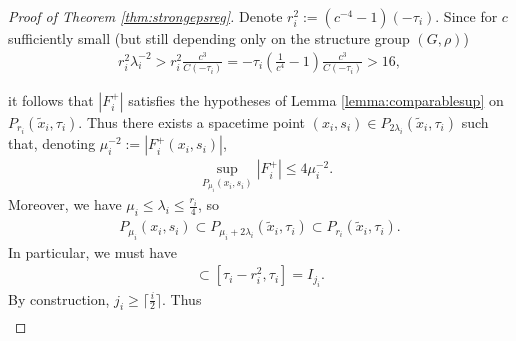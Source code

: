 \documentclass[12pt]{amsart}
\renewcommand{\1}{{\mathbf 1}}
\theoremstyle{others}
\numberwithin{equation}{section}
\begin{document}
\begin{proof}[Proof of Theorem \ref{thm:strongepsreg}]

Denote $r_i^2 := (c^{-4}-1)(-\tau_i).$
Since for \(c\) sufficiently small (but still depending only on the structure group \((G, \rho)\))
\begin{align*}
    r_i^2\lambda_{i}^{-2} > r_i^2\frac{c^{3}}{C(-\tau_i)} = -\tau_i\left(\frac{1}{c^4}-1\right)\frac{c^{3}}{C(-\tau_i)} > 16,
\end{align*}

it follows that \(|F_i^+|\) satisfies the hypotheses of Lemma \ref{lemma:comparablesup} on $P_{r_i}(\tilde{x}_i, \tau_i).$ %
Thus there exists a spacetime point $(x_i, s_i) \in P_{2\lambda_i}(\tilde{x}_i, \tau_i)$
such that, denoting \(\mu_i^{-2} := |F_i^+(x_i, s_i)|\),
\begin{align}\label{F+comparablesup}
    &\sup_{P_{\mu_i}(x_i, s_i)} |F_i^+| \leq 4\mu_i^{-2}.
\end{align} Moreover, we have \(\mu_i \leq \lambda_{i} \leq \frac{r_i}{4}\), so
\begin{align*}
    P_{\mu_i}(x_i, s_i) \subset P_{\mu_i + 2\lambda_{i}}(\tilde{x}_i, \tau_i) \subset P_{r_i}(\tilde{x}_i, \tau_i). 
\end{align*} In particular, we must have
\begin{align*}
    [s_i - \mu_i^2, s_i] \subset [\tau_i - r_i^2, \tau_i] = I_{j_i}.
\end{align*}
By construction, $j_i \geq \lceil \frac{i}{2}\rceil.$ Thus
\begin{align*}

\end{align*}
\end{proof}
\end{document}
